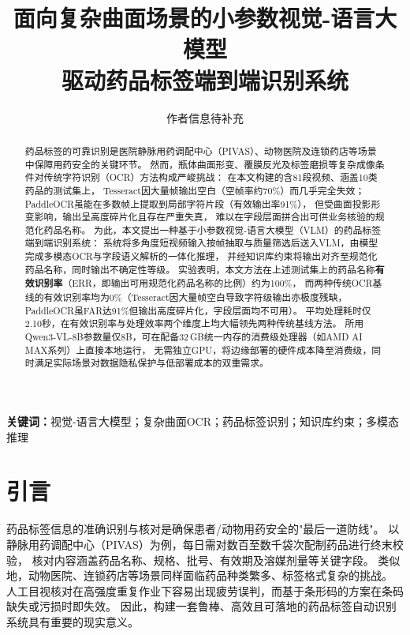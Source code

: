 \documentclass[12pt, a4paper]{article}
\title{%
  面向复杂曲面场景的小参数视觉-语言大模型\\
  驱动药品标签端到端识别系统%
}
\author{作者信息待补充}
\date{}
\begin{document}
\maketitle

\begin{abstract}
药品标签的可靠识别是医院静脉用药调配中心（PIVAS）、动物医院及连锁药店等场景中保障用药安全的关键环节。
然而，瓶体曲面形变、覆膜反光及标签磨损等复杂成像条件对传统字符识别（OCR）方法构成严峻挑战：
在本文构建的含81段视频、涵盖10类药品的测试集上，
Tesseract因大量帧输出空白（空帧率约70\%）而几乎完全失效；
PaddleOCR虽能在多数帧上提取到局部字符片段（有效输出率91\%），
但受曲面投影形变影响，输出呈高度碎片化且存在严重失真，
难以在字段层面拼合出可供业务核验的规范化药品名称。
为此，本文提出一种基于小参数视觉-语言大模型（VLM）的药品标签端到端识别系统：
系统将多角度短视频输入按帧抽取与质量筛选后送入VLM，由模型完成多模态OCR与字段语义解析的一体化推理，
并经知识库约束将输出对齐至规范化药品名称，同时输出不确定性等级。
实验表明，本文方法在上述测试集上的药品名称\textbf{有效识别率}（ERR，即输出可用规范化药品名称的比例）约为100\%，
而两种传统OCR基线的有效识别率均为0\%（Tesseract因大量帧空白导致字符级输出亦极度残缺，PaddleOCR虽FAR达91\%但输出高度碎片化，字段层面均不可用）。
平均处理耗时仅2.10秒，在有效识别率与处理效率两个维度上均大幅领先两种传统基线方法。
所用Qwen3-VL-8B参数量仅8B，可在配备32\,GB统一内存的消费级处理器（如AMD AI MAX系列）上直接本地运行，
无需独立GPU，将边缘部署的硬件成本降至消费级，同时满足实际场景对数据隐私保护与低部署成本的双重需求。
\end{abstract}

\noindent\textbf{关键词：}视觉-语言大模型；复杂曲面OCR；药品标签识别；知识库约束；多模态推理


\section{引言}
\label{sec:intro}

药品标签信息的准确识别与核对是确保患者/动物用药安全的"最后一道防线"。
以静脉用药调配中心（PIVAS）为例，每日需对数百至数千袋次配制药品进行终末校验，
核对内容涵盖药品名称、规格、批号、有效期及溶媒剂量等关键字段\cite{ref:pivas_safety}。
类似地，动物医院、连锁药店等场景同样面临药品种类繁多、标签格式复杂的挑战。
人工目视核对在高强度重复作业下容易出现疲劳误判，而基于条形码的方案在条码缺失或污损时即失效。
因此，构建一套鲁棒、高效且可落地的药品标签自动识别系统具有重要的现实意义。
\end{document}
